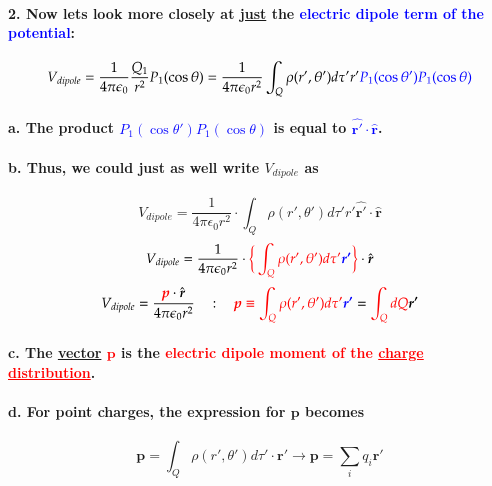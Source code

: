 \documentclass{article}
\begin{document}
\paragraph{2. Now lets look more closely at \underline{just} the \textcolor{blue}{electric dipole term of the potential}:}
\begin{equation*}
    V_{dipole}=\frac{1}{4\pi\epsilon_0}\frac{Q_1}{r^2}P_1(\cos\theta)=\frac{1}{4\pi\epsilon_0r^2}\int_Q \rho(r',\theta')d\tau'r'\textcolor{blue}{P_1(\cos\theta')P_1(\cos\theta)}
\end{equation*}
\paragraph{\indent a. The product \textcolor{blue}{$P_1(\cos\theta')P_1(\cos\theta)$} is equal to \textcolor{blue}{$\hat{\boldsymbol{r'}}\cdot\hat{\boldsymbol{r}}$}.}
\paragraph{\indent b. Thus, we could just as well write $V_{dipole}$ as}
\begin{equation*}
    V_{dipole} =\frac{1}{4\pi\epsilon_0r^2}\cdot\int_Q \rho(r',\theta') d\tau' r'\hat{\boldsymbol{r'}}\cdot\hat{\boldsymbol{r}}
\end{equation*}
\begin{equation*}
    V_{dipole}=\frac{1}{4\pi\epsilon_0r^2}\cdot \textcolor{red}{\bigg\{ \int_Q \rho(r',\theta')d\tau'}\textcolor{blue}{\boldsymbol{r'}}\textcolor{red}{\bigg\}}\cdot \hat{\boldsymbol{r}}
\end{equation*}
\begin{equation*}
    V_{dipole}=\frac{\textcolor{red}{\boldsymbol{p}}\cdot \hat{\boldsymbol{r}}}{4\pi\epsilon_0r^2}\quad:\quad \textcolor{red}{\boldsymbol{p}\equiv\int_Q \rho(r',\theta')d\tau'}\textcolor{blue}{\boldsymbol{r'}}=\textcolor{red}{\int_Q dQ} \boldsymbol{r'}
\end{equation*} 
\paragraph{\indent c. The \underline{vector} \textcolor{red}{$\boldsymbol{p}$} is the \textcolor{red}{electric dipole moment of the \underline{charge distribution}}.}
\paragraph{\indent d. For point charges, the expression for $\boldsymbol{p}$ becomes}
\begin{equation*}
    \boldsymbol{p}=\int_Q \rho(r',\theta') d\tau' \cdot \boldsymbol{r'} \longrightarrow \boldsymbol{p}=\sum_{i}q_i\boldsymbol{r'}
\end{equation*}
\end{document}
